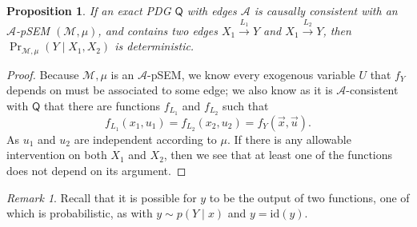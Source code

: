 \documentclass{article}
\newcommand{\bp}[1][L]{\mathbf{p}_{\!_#1\!}}
\newcommand{\Ed}{\mathcal A}
\newcommand{\dg}[1]{\mathsf #1}
\theoremstyle{plain}
\newtheorem{prop}[theorem]{Proposition}
\newtheorem{claim}[theorem]{Claim}
\theoremstyle{definition}
\theoremstyle{remark}
\newtheorem*{remark}{Remark}
\begin{document}
\begin{prop}
	If an exact PDG $\dg Q$ with edges $\Ed$ is causally consistent with an $\Ed$-pSEM $(\mathcal M, \mu)$, and contains two edges $X_1 \overset{L_1}\longrightarrow Y$ and $X_1 \overset{L_2}\longrightarrow Y$, then $\Pr_{\mathcal M, \mu}(Y \mid X_1, X_2)$ is deterministic.
\end{prop}
\begin{proof}

	Because $\mathcal M,\mu$ is an $\Ed$-pSEM, we know every exogenous variable $U$ that $f_Y$ depends on must be associated to some edge; we also know as it is $\mathcal A$-consistent with $\dg Q$ that there are functions $f_{L_1}$ and $f_{L_2} $ such that
	\[ f_{L_1}(x_1, u_1) = f_{L_2}(x_2, u_2) = f_Y(\vec x, \vec u). \]
	As $u_1$ and $u_2$ are independent according to $\mu$. If there is any allowable intervention on both $X_1$ and $X_2$, then we see that at least one of the functions does not depend on its argument.
\end{proof}

\begin{remark}
	Recall that it is possible for $y$ to be the output of two functions, one of which is probabilistic, as with $y \sim p(Y\mid x)$ and $y = \mathrm{id}(y)$.
\end{remark}


\end{document}
